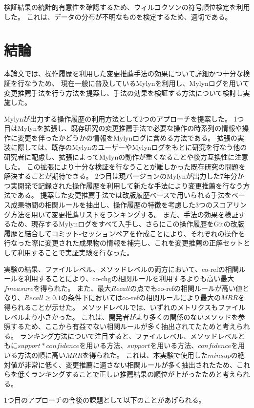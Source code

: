 \documentclass[a4paper]{jsbook}
\newcommand{\confidence}{con\!f\!idence}
\begin{document}
検証結果の統計的有意性を確認するため、ウィルコクソンの符号順位検定を利用した。
これは、データの分布が不明なものを検定するため、適切である。
\chapter{結論}\label{conclusion_chap}
本論文では、操作履歴を利用した変更推薦手法の効果について詳細かつ十分な検証を行なうため、
現在一般に普及しているMylynを利用し、Mylynログを用いて変更推薦手法を行う方法を提案し、手法の効果を検証する方法について検討し実施した。

Mylynが出力する操作履歴の利用方法として2つのアプローチを提案した。
1つ目はMylynを拡張し、既存研究の変更推薦手法で必要な操作の時系列の情報や操作に変更を伴ったかどうかの情報をMylynログに含める方法である。
拡張の実装に際しては、既存のMylynのユーザーやMylynログをもとに研究を行なう他の研究者に配慮し、拡張によってMylynの動作が重くなることや後方互換性に注意した。
この拡張により十分な検証を行なうことが難しかった既存研究の問題を解決することが期待できる。
2つ目は現バージョンのMylynが出力した7年分かつ実開発で記録された操作履歴を利用して新たな手法により変更推薦を行なう方法である。
提案した変更推薦手法では改版履歴ベースで用いられる手法をベース成果物間の相関ルールを抽出し、操作履歴の特徴を考慮した3つのスコアリング方法を用いて変更推薦リストをランキングする。
また、手法の効果を検証するため、現存するMylynログをすべて入手し、さらにこの操作履歴をGitの改版履歴と結合してコミット-セッションペアを作成ことにより、それぞれの操作を行なった際に変更された成果物の情報を補完し、これを変更推薦の正解セットとして利用することで実証実験を行なった。

実験の結果、ファイルレベル、メソッドレベルの両方において、co-refの相関ルールを利用することにより、co-chgの相関ルールを利用するよりも高い最大$fmeasure$を得られた。
また、最大$Recall$の点でもco-refの相関ルールが高い値となり、$Recall \geq 0.1$の条件下においてはco-refの相関ルールにより最大の$MRR$を得られることが示せた。
メソッドレベルでは、いずれのメトリクスもファイルレベルより小さかった。
これは、開発者がより多くの関係のないメソッドを参照するため、ここから有益でない相関ルールが多く抽出されてたためと考えられる。
ランキング方法について注目すると、ファイルレベル、メソッドレベルともに$support*\confidence$を用いる方法、$support$を用いる方法、$\confidence$を用いる方法の順に高い$MRR$を得られた。
これは、本実験で使用した$minsup$の絶対値が非常に低く、変更推薦に適さない相関ルールが多く抽出されたため、これらを低くランキングすることで正しい推薦結果の順位が上がったためと考えられる。

1つ目のアプローチの今後の課題として以下のことがあげられる。
\end{document}
